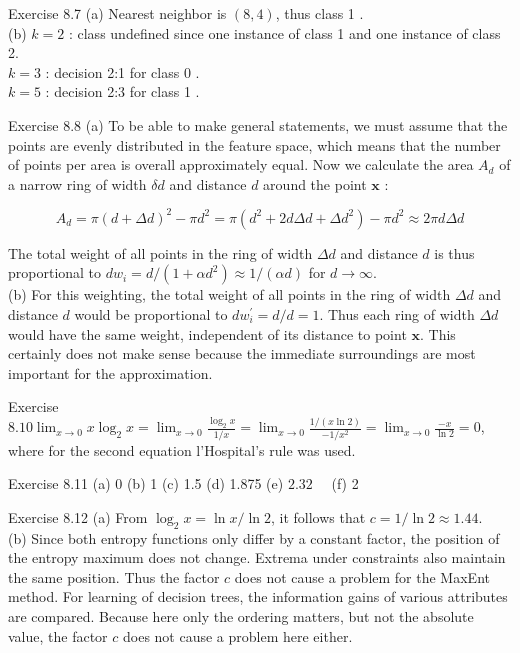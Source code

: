 \documentclass[10pt]{book}
\begin{document}
Exercise 8.7
(a) Nearest neighbor is $(8,4)$, thus class 1 .\\
(b) $k=2$ : class undefined since one instance of class 1 and one instance of class 2.\\
$k=3$ : decision 2:1 for class 0 .\\
$k=5$ : decision 2:3 for class 1 .

Exercise 8.8
(a) To be able to make general statements, we must assume that the points are evenly distributed in the feature space, which means that the number of points per area is overall approximately equal. Now we calculate the area $A_{d}$ of a narrow ring of width $\delta d$ and distance $d$ around the point $\boldsymbol{x}$ :

$$
A_{d}=\pi(d+\Delta d)^{2}-\pi d^{2}=\pi\left(d^{2}+2 d \Delta d+\Delta d^{2}\right)-\pi d^{2} \approx 2 \pi d \Delta d
$$

The total weight of all points in the ring of width $\Delta d$ and distance $d$ is thus proportional to $d w_{i}=d /\left(1+\alpha d^{2}\right) \approx 1 /(\alpha d)$ for $d \rightarrow \infty$.\\
(b) For this weighting, the total weight of all points in the ring of width $\Delta d$ and distance $d$ would be proportional to $d w_{i}^{\prime}=d / d=1$. Thus each ring of width $\Delta d$ would have the same weight, independent of its distance to point $\boldsymbol{x}$. This certainly does not make sense because the immediate surroundings are most important for the approximation.

Exercise $8.10 \lim _{x \rightarrow 0} x \log _{2} x=\lim _{x \rightarrow 0} \frac{\log _{2} x}{1 / x}=\lim _{x \rightarrow 0} \frac{1 /(x \ln 2)}{-1 / x^{2}}=\lim _{x \rightarrow 0} \frac{-x}{\ln 2}=0$, where for the second equation l'Hospital's rule was used.


Exercise 8.11 (a) 0 (b) 1 (c) 1.5 (d) 1.875 (e) $2.32 \quad$ (f) 2

Exercise 8.12
(a) From $\log _{2} x=\ln x / \ln 2$, it follows that $c=1 / \ln 2 \approx 1.44$.\\
(b) Since both entropy functions only differ by a constant factor, the position of the entropy maximum does not change. Extrema under constraints also maintain the same position. Thus the factor $c$ does not cause a problem for the MaxEnt method. For learning of decision trees, the information gains of various attributes are compared. Because here only the ordering matters, but not the absolute value, the factor $c$ does not cause a problem here either.
\end{document}
